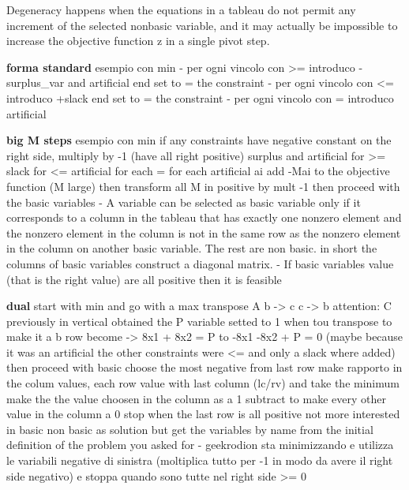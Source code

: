\documentclass[11pt]{article}
\begin{document}
Degeneracy happens when the equations in a tableau do not permit any increment of the selected nonbasic variable,
and it may actually be impossible to increase the objective function z in a single pivot step.

\textbf{forma standard} esempio con min
- per ogni vincolo con >= introduco -surplus_var and artificial end set to = the constraint 
- per ogni vincolo con <= introduco +slack                      end set to = the constraint 
- per ogni vincolo con = introduco artificial


\textbf{big M steps} esempio con min
if any constraints have negative constant on the right side, multiply by -1 (have all right positive)
surplus and artificial for >=
slack for <=
artificial for each =
for each artificial ai add -Mai to the objective function (M large) then transform all M in positive by mult -1
then proceed with the basic variables
- A variable can be selected as basic variable only if it corresponds to a column in the tableau that has exactly one
nonzero element and the nonzero element in the column is not in the same row as the nonzero element in the column on another basic variable.
The rest are non basic. in short the columns of basic variables construct a diagonal matrix.
- If basic variables value (that is the right value) are all positive then it is feasible

\textbf{dual} start with min and go with a max
transpose A
b -> c
c -> b
attention: C previously in vertical obtained the P variable setted to 1 when tou transpose to make it a b row become
            -> 8x1 + 8x2 = P      to      -8x1 -8x2 + P = 0
                (maybe because it was an artificial the other constraints were <= and only a slack where added)
then proceed with basic choose the most negative from last row make rapporto in the colum values, each row value with last column (lc/rv) and take the minimum
make the the value choosen in the column as a 1
subtract to make every other value in the column a 0
stop when the last row is all positive
not more interested in basic non basic as solution but get the variables by name from the initial definition of the problem you asked for
- geekrodion sta minimizzando e utilizza le variabili negative di sinistra (moltiplica tutto per -1 in modo da avere il right side negativo)
        e stoppa quando sono tutte nel right side >= 0
\end{document}
